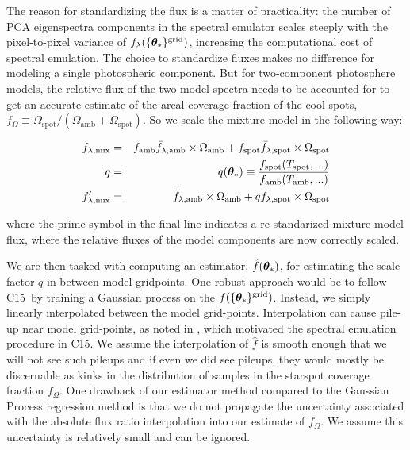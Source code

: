 \documentclass[twocolumn]{emulateapj}%
\newcommand{\iancze}{{\sc C15}}
\begin{document}
The reason for standardizing the flux is a matter of practicality: the number of PCA eigenspectra components in the spectral emulator scales steeply with the pixel-to-pixel variance of $f_{\lambda}(\{{\bm \theta}_{\ast}\}^\textrm{grid})$, increasing the computational cost of spectral emulation.  The choice to standardize fluxes makes no difference for modeling a single photospheric component.  But for two-component photosphere models, the relative flux of the two model spectra needs to be accounted for to get an accurate estimate of the areal coverage fraction of the cool spots, $f_{\Omega} \equiv \Omega_{\mathrm{spot}}/(\Omega_{\mathrm{amb}}+\Omega_{\mathrm{spot}})$.  So we scale the mixture model in the following way:

\begin{eqnarray} \label{eqn:norm_scaling}
f_{\lambda, \mathrm{mix}} &=& f_{\mathrm{amb}} \bar f_{\lambda, \mathrm{amb}} \times \Omega_{\mathrm{amb}} + f_{\mathrm{spot}} \bar f_{\lambda, \mathrm{spot}} \times \Omega_{\mathrm{spot}} \\
q &=& q({\bm \theta}_{\ast})\equiv \frac{f_{\mathrm{spot}}(T_\textrm{spot}, ...)}{f_{\mathrm{amb}}(T_\textrm{amb}, ...)} \\
f_{\lambda, \mathrm{mix}}^{\prime} &=& \bar f_{\lambda, \mathrm{amb}} \times \Omega_{\mathrm{amb}} + q \bar f_{\lambda, \mathrm{spot}} \times \Omega_{\mathrm{spot}}
\end{eqnarray}

where the prime symbol in the final line indicates a re-standarized mixture model flux, where the relative fluxes of the model components are now correctly scaled.

We are then tasked with computing an estimator, $\hat f({\bm \theta}_{\ast})$, for estimating the scale factor $q$ in-between model gridpoints.  One robust approach would be to follow \iancze\ by training a Gaussian process on the $f(\{{\bm \theta}_{\ast}\}^\textrm{grid})$.  Instead, we simply linearly interpolated between the model grid-points.  Interpolation can cause pile-up near model grid-points, as noted in \citet{cottaar14}, which motivated the spectral emulation procedure in \iancze.  We assume the interpolation of $\hat f$ is smooth enough that we will not see such pileups and if even we did see pileups, they would mostly be discernable as kinks in the distribution of samples in the starspot coverage fraction $f_{\Omega}$.  One drawback of our estimator method compared to the Gaussian Process regression method is that we do not propagate the uncertainty associated with the absolute flux ratio interpolation into our estimate of $f_{\Omega}$.  We assume this uncertainty is relatively small and can be ignored.
\end{document}
